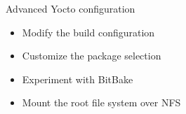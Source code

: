 \setuplabframe
{Advanced Yocto configuration}
{
  \begin{itemize}
    \item Modify the build configuration
    \item Customize the package selection
    \item Experiment with BitBake
    \item Mount the root file system over NFS
  \end{itemize}
}
